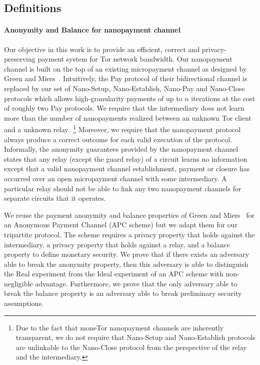 \subsection{Definitions}

\paragraph*{Anonymity and Balance for nanopayment channel} Our objective in this work is to provide an efficient, correct and privacy-preserving payment system for Tor network bandwidth.
Our nanopayment channel is built on the top of an existing micropayment channel as designed by Green and Miers~\cite{green2017bolt}.
Intuitively, the Pay protocol of their bidirectional channel is replaced by our set of Nano-Setup, Nano-Establish, Nano-Pay and Nano-Close protocols which allows high-granularity payments of up to $n$ iterations at the cost of roughly two Pay protocols.
We require that the intermediary does not learn more than the number of nanopayments realized between an unknown Tor client and a unknown relay.~\footnote{Due to the fact that moneTor nanopayment channels are inherently transparent, we do not require that Nano-Setup and Nano-Establish protocols are unlinkable to the Nano-Close protocol from the perspective of the relay and the intermediary.}
Moreover, we require that the nanopayment protocol always produce a correct outcome for each valid execution of the protocol.
Informally, the anonymity guarantees provided by the nanopayment channel states that any relay (except the guard relay) of a circuit learns no information except that a valid nanopayment channel establishment, payment or closure has occurred over an open micropayment channel with some intermediary.
A particular relay should not be able to link any two nanopayment channels for separate circuits that it operates.

We reuse the payment anonymity and balance properties of Green and Miers~\cite{bolt-eprint} for an Anonymous Payment Channel (APC scheme) but we adapt them for our tripartite protocol.
The scheme requires a privacy property that holds against the intermediary, a privacy property that holds against a relay, and a balance property to define monetary security.
We prove that if there exists an adversary able to break the anonymity property, then this adversary is able to distinguish the Real experiment from the Ideal experiment of an APC scheme with non-negligible advantage.
Furthermore, we prove that the only adversary able to break the balance property is an adversary able to break preliminary security assumptions.

